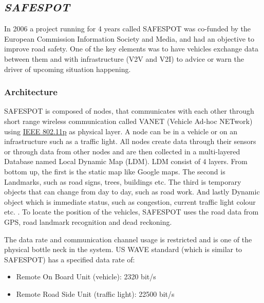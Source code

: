 \subsection{\textit{SAFESPOT}}
In 2006 a project running for 4 years called SAFESPOT \cite{Safespot} was co-funded by the European Commission Information Society and Media, and had an objective to improve road safety. One of the key elements was to have vehicles exchange data between them and with infrastructure (V2V and V2I) to advice or warn the driver of upcoming situation happening.\par
% 
\subsubsection{Architecture}
SAFESPOT is composed of nodes, that communicates with each other through short range wireless communication called VANET (Vehicle Ad-hoc NETwork) using \hyperref[sec:802.11p]{IEEE 802.11p} as physical layer. A node can be in a vehicle or on an infrastructure such as a traffic light. All nodes create data through their sensors or through data from other nodes and are then collected in a multi-layered Database named Local Dynamic Map (LDM).
LDM consist of 4 layers. From bottom up, the first is the static map like Google maps. The second is Landmarks, such as road signs, trees, buildings etc. The third is temporary objects that can change from day to day, such as road work. And lastly Dynamic object which is immediate status, such as congestion, current traffic light colour etc. \cite{Brignolo2008UseProject}.
To locate the position of the vehicles, SAFESPOT uses the road data from GPS, road landmark recognition and dead reckoning\footnotemark.\par
%
% 
% 
% 
The data rate and communication channel usage is restricted and is one of the physical bottle neck in the system. US WAVE standard (which is similar to SAFESPOT) has a specified data rate of:
\begin{itemize}[noitemsep]
    \item Remote On Board Unit (vehicle): 2320 bit/s
    \item Remote Road Side Unit (traffic light): 22500 bit/s  
\end{itemize}
